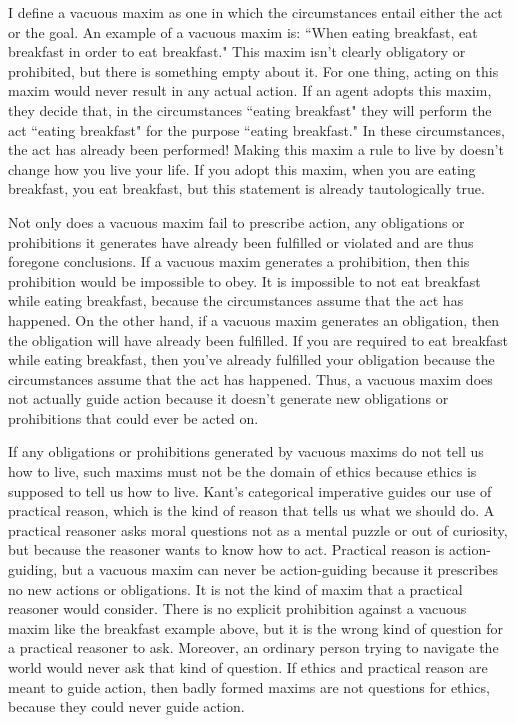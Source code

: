 \begin{isabellebody}
\begin{isamarkuptext}
I define a vacuous maxim as one in which the circumstances entail either the act or the goal. An example
of a vacuous maxim is: ``When eating breakfast, eat breakfast in order to eat breakfast." This 
maxim isn't clearly obligatory or prohibited, but there is something empty about it. For one 
thing, acting on this maxim would never result in any actual action. If an agent adopts this maxim, 
they decide that, in the circumstances ``eating breakfast" they will perform the act ``eating breakfast"
for the purpose ``eating breakfast." In these circumstances, the act has 
already been performed! Making this maxim a rule to live by doesn't change how you live your life. If 
you adopt this maxim, when you are eating breakfast, you eat breakfast, but this statement is already 
tautologically true. 

Not only does a vacuous maxim fail to prescribe action, any obligations or prohibitions it 
generates have already been fulfilled or violated and are thus foregone conclusions. If a vacuous 
maxim generates a prohibition, then this prohibition would be impossible to obey. 
It is impossible to not eat breakfast while eating breakfast, because the circumstances assume that the 
act has happened. On the other hand, if a vacuous maxim generates an obligation, then the obligation 
will have already been fulfilled. If you are required to eat breakfast while eating breakfast, then you've 
already fulfilled your obligation because the circumstances assume that the act has happened. Thus, 
a vacuous maxim does not actually guide action because it doesn't generate new obligations or 
prohibitions that could ever be acted on. 

If any obligations or prohibitions generated by vacuous maxims do not tell us how to live, such 
maxims must not be the domain of ethics because ethics is 
supposed to tell us how to live. Kant's categorical imperative
 guides our use of practical reason, which is the kind of reason that tells us what we should do. 
A practical reasoner asks moral questions not as a mental puzzle or out of curiosity, but 
because the reasoner wants to know how to act. Practical reason is action-guiding, but a vacuous
 maxim can never be action-guiding because it prescribes no new
actions or obligations. It is not the kind of maxim that a practical reasoner would consider. 
There is no explicit prohibition against a vacuous maxim like the breakfast example above, but it 
is the wrong kind of question for a practical reasoner to ask. Moreover, an ordinary person trying 
to navigate the world would never ask that kind of question. If ethics and practical reason are meant 
to guide action, then badly formed maxims are not questions for ethics, because they could never guide 
action.


\end{isamarkuptext}
\end{isabellebody}
